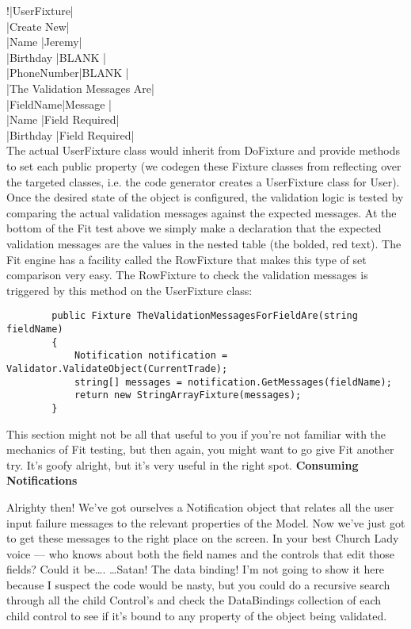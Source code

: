 \documentclass{article}
\begin{document}
{	!|UserFixture|\\
	 |Create New|\\
	 |Name       |Jeremy|\\
	 |Birthday   |BLANK |\\
	 |PhoneNumber|BLANK |\\
	 |The Validation Messages Are|\\
	 |FieldName|Message       |\\
	 |Name     |Field Required|\\
	 |Birthday |Field Required|\\

The actual UserFixture class would inherit from DoFixture and provide methods to set each public property (we codegen these Fixture classes from reflecting over the targeted classes, i.e. the code generator creates a UserFixture class for User).  Once the desired state of the object is configured, the validation logic is tested by comparing the actual validation messages against the expected messages.  At the bottom of the Fit test above we simply make a declaration that the expected validation messages are the values in the nested table (the bolded, red text).  The Fit engine has a facility called the RowFixture that makes this type of set comparison very easy.  The RowFixture to check the validation messages is triggered by this method on the UserFixture class:
\begin{lstlisting}
        public Fixture TheValidationMessagesForFieldAre(string fieldName)
        {
            Notification notification = Validator.ValidateObject(CurrentTrade);
            string[] messages = notification.GetMessages(fieldName);
            return new StringArrayFixture(messages);
        }
\end{lstlisting}		

This section might not be all that useful to you if you're not familiar with the mechanics of Fit testing, but then again, you might want to go give Fit another try.  It's goofy alright, but it's very useful in the right spot.
\Large {\textbf{Consuming Notifications}}

Alrighty then!  We've got ourselves a Notification object that relates all the user input failure messages to the relevant properties of the Model.  Now we've just got to get these messages to the right place on the screen. In your best Church Lady voice — who knows about both the field names and the controls that edit those fields?  Could it be….   …Satan!  The data binding!  I'm not going to show it here because I suspect the code would be nasty, but you could do a recursive search through all the child Control's and check the DataBindings collection of each child control to see if it's bound to any property of the object being validated. 

}
\end{document}
